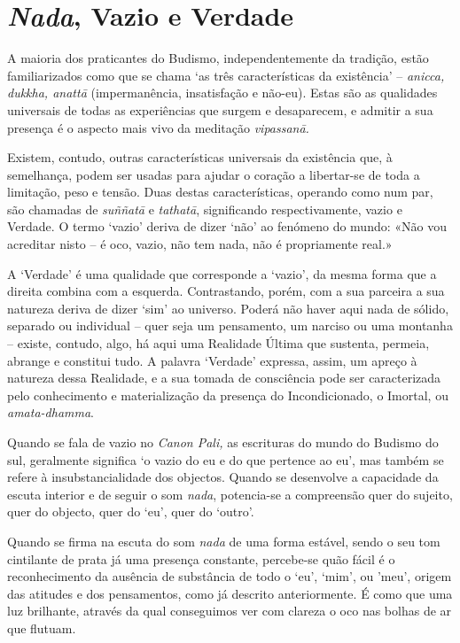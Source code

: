\chapter{\emph{Nada}, Vazio e Verdade}

A maioria dos praticantes do Budismo, independentemente da tradição,
estão familiarizados como que se chama `as três características da
existência' -- \emph{anicca, dukkha, anattā} (impermanência,
insatisfação e não-eu). Estas são as qualidades universais de todas as
experiências que surgem e desaparecem, e admitir a sua presença é o
aspecto mais vivo da meditação \emph{vipassanā.}

Existem, contudo, outras características universais da existência que, à
semelhança, podem ser usadas para ajudar o coração a libertar-se de toda
a limitação, peso e tensão. Duas destas características, operando como
num par, são chamadas de \emph{suññatā} e \emph{tathatā}, significando
respectivamente, vazio e Verdade. O termo `vazio' deriva de dizer `não'
ao fenómeno do mundo: «Não vou acreditar nisto -- é oco, vazio, não tem
nada, não é propriamente real.»

A `Verdade' é uma qualidade que corresponde a `vazio', da mesma forma
que a direita combina com a esquerda. Contrastando, porém, com a sua
parceira a sua natureza deriva de dizer `sim' ao universo. Poderá não
haver aqui nada de sólido, separado ou individual -- quer seja um
pensamento, um narciso ou uma montanha -- existe, contudo, algo, há aqui
uma Realidade Última que sustenta, permeia, abrange e constitui tudo. A
palavra `Verdade' expressa, assim, um apreço à natureza dessa Realidade,
e a sua tomada de consciência pode ser caracterizada pelo conhecimento e
materialização da presença do Incondicionado, o Imortal, ou
\emph{amata-dhamma}.

Quando se fala de vazio no \emph{Canon Pali,} as escrituras do mundo do
Budismo do sul, geralmente significa `o vazio do eu e do que pertence ao
eu', mas também se refere à insubstancialidade dos objectos. Quando se
desenvolve a capacidade da escuta interior e de seguir o som
\emph{nada}, potencia-se a compreensão quer do sujeito, quer do objecto,
quer do `eu', quer do `outro'.

Quando se firma na escuta do som \emph{nada} de uma forma estável, sendo
o seu tom cintilante de prata já uma presença constante, percebe-se quão
fácil é o reconhecimento da ausência de substância de todo o `eu',
`mim', ou 'meu', origem das atitudes e dos pensamentos, como já descrito
anteriormente. É como que uma luz brilhante, através da qual conseguimos
ver com clareza o oco nas bolhas de ar que flutuam.

